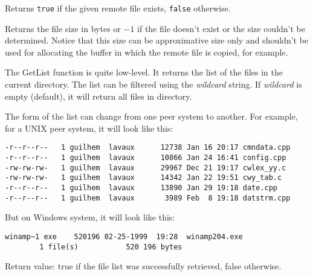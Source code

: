 \label{wxftpfileexists}


Returns {\tt true} if the given remote file exists, {\tt false} otherwise.

\label{wxftpgetfilesize}


Returns the file size in bytes or $-1$ if the file doesn't exist or the size
couldn't be determined. Notice that this size can be approximative size only
and shouldn't be used for allocating the buffer in which the remote file is
copied, for example.

\label{wxftpgetdirlist}


The GetList function is quite low-level. It returns the list of the files in
the current directory. The list can be filtered using the {\it wildcard} string.
If {\it wildcard} is empty (default), it will return all files in directory.

The form of the list can change from one peer system to another. For example,
for a UNIX peer system, it will look like this:

\begin{verbatim}
-r--r--r--   1 guilhem  lavaux      12738 Jan 16 20:17 cmndata.cpp
-r--r--r--   1 guilhem  lavaux      10866 Jan 24 16:41 config.cpp
-rw-rw-rw-   1 guilhem  lavaux      29967 Dec 21 19:17 cwlex_yy.c
-rw-rw-rw-   1 guilhem  lavaux      14342 Jan 22 19:51 cwy_tab.c
-r--r--r--   1 guilhem  lavaux      13890 Jan 29 19:18 date.cpp
-r--r--r--   1 guilhem  lavaux       3989 Feb  8 19:18 datstrm.cpp
\end{verbatim}

But on Windows system, it will look like this:

\begin{verbatim}
winamp~1 exe    520196 02-25-1999  19:28  winamp204.exe
        1 file(s)           520 196 bytes
\end{verbatim}

Return value: true if the file list was successfully retrieved, false
otherwise.



